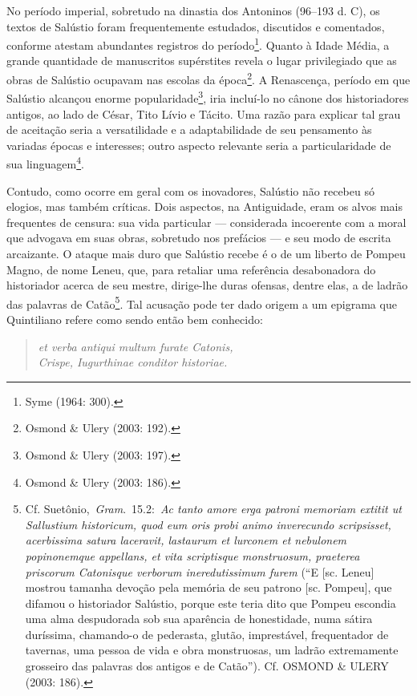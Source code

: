 No período imperial, sobretudo na dinastia dos Antoninos (96--193 d. C), os
textos de Salústio foram frequentemente estudados, discutidos e comentados,
conforme atestam abundantes registros do período\footnote{Syme (1964: 300).}.
Quanto à Idade Média, a grande quantidade de manuscritos supérstites revela o
lugar privilegiado que as obras de Salústio ocupavam nas escolas da
época\footnote{Osmond \& Ulery (2003: 192).}. A Renascença, período em que
Salústio alcançou enorme popularidade\footnote{Osmond \& Ulery (2003: 197).},
iria incluí-lo no cânone dos historiadores antigos, ao lado de César, Tito
Lívio e Tácito. Uma razão para explicar tal grau de aceitação seria a
versatilidade e a adaptabilidade de seu pensamento às variadas épocas e
interesses; outro aspecto relevante seria a particularidade de sua
linguagem\footnote{Osmond \& Ulery (2003: 186).}. 

Contudo, como ocorre em geral com os inovadores, Salústio não recebeu só
elogios, mas também críticas. Dois aspectos, na Antiguidade, eram os alvos mais
frequentes de censura: sua vida particular --- considerada incoerente com a
moral que advogava em suas obras, sobretudo nos prefácios --- e seu modo de 
escrita arcaizante.  O ataque mais duro que Salústio recebe é o de um liberto
de Pompeu Magno, de nome Leneu, que, para retaliar uma referência desabonadora
do historiador acerca de seu mestre, dirige-lhe duras ofensas, dentre elas, a
de ladrão das palavras de Catão\footnote{Cf. Suetônio, \emph{Gram}. 15.2: \emph{Ac tanto amore erga patroni memoriam extitit ut Sallustium historicum, quod eum oris probi animo inverecundo scripsisset, acerbissima satura laceravit, lastaurum et lurconem et nebulonem popinonemque appellans, et vita scriptisque monstruosum, praeterea priscorum Catonisque verborum ineredutissimum furem}
(“E [sc. Leneu] mostrou tamanha devoção pela memória de seu patrono [sc. Pompeu], que difamou o historiador Salústio, porque este teria dito que Pompeu escondia uma alma despudorada sob sua aparência de honestidade, numa sátira duríssima, chamando-o de pederasta, glutão, imprestável, frequentador de tavernas, uma pessoa de vida e obra monstruosas, um ladrão extremamente grosseiro das palavras dos antigos e de Catão”). Cf. OSMOND \& ULERY (2003: 186).}. Tal acusação pode ter dado origem a um epigrama que
Quintiliano refere como sendo então bem conhecido: 

\begin{verse}
\emph{et verba antiqui
multum furate Catonis,\\ Crispe, Iugurthinae conditor historiae.} 

\end{verse}
 



